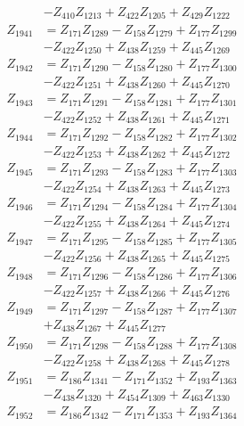\begin{multicols}{2}
\begin{align}
&- Z_{410}Z_{1213} + Z_{422}Z_{1205} + Z_{429}Z_{1222} \nonumber \\
Z_{1941} &= Z_{171}Z_{1289} - Z_{158}Z_{1279} + Z_{177}Z_{1299}  \nonumber \\
&- Z_{422}Z_{1250} + Z_{438}Z_{1259} + Z_{445}Z_{1269} \nonumber \\
Z_{1942} &= Z_{171}Z_{1290} - Z_{158}Z_{1280} + Z_{177}Z_{1300}  \nonumber \\
&- Z_{422}Z_{1251} + Z_{438}Z_{1260} + Z_{445}Z_{1270} \nonumber \\
Z_{1943} &= Z_{171}Z_{1291} - Z_{158}Z_{1281} + Z_{177}Z_{1301}  \nonumber \\
&- Z_{422}Z_{1252} + Z_{438}Z_{1261} + Z_{445}Z_{1271} \nonumber \\
Z_{1944} &= Z_{171}Z_{1292} - Z_{158}Z_{1282} + Z_{177}Z_{1302}  \nonumber \\
&- Z_{422}Z_{1253} + Z_{438}Z_{1262} + Z_{445}Z_{1272} \nonumber \\
Z_{1945} &= Z_{171}Z_{1293} - Z_{158}Z_{1283} + Z_{177}Z_{1303}  \nonumber \\
&- Z_{422}Z_{1254} + Z_{438}Z_{1263} + Z_{445}Z_{1273} \nonumber \\
Z_{1946} &= Z_{171}Z_{1294} - Z_{158}Z_{1284} + Z_{177}Z_{1304}  \nonumber \\
&- Z_{422}Z_{1255} + Z_{438}Z_{1264} + Z_{445}Z_{1274} \nonumber \\
Z_{1947} &= Z_{171}Z_{1295} - Z_{158}Z_{1285} + Z_{177}Z_{1305}  \nonumber \\
&- Z_{422}Z_{1256} + Z_{438}Z_{1265} + Z_{445}Z_{1275} \nonumber \\
Z_{1948} &= Z_{171}Z_{1296} - Z_{158}Z_{1286} + Z_{177}Z_{1306}  \nonumber \\
&- Z_{422}Z_{1257} + Z_{438}Z_{1266} + Z_{445}Z_{1276} \nonumber \\
Z_{1949} &= Z_{171}Z_{1297} - Z_{158}Z_{1287} + Z_{177}Z_{1307}  \nonumber \\
&+ Z_{438}Z_{1267} + Z_{445}Z_{1277} \nonumber \\
Z_{1950} &= Z_{171}Z_{1298} - Z_{158}Z_{1288} + Z_{177}Z_{1308}  \nonumber \\
&- Z_{422}Z_{1258} + Z_{438}Z_{1268} + Z_{445}Z_{1278} \nonumber \\
Z_{1951} &= Z_{186}Z_{1341} - Z_{171}Z_{1352} + Z_{193}Z_{1363}  \nonumber \\
&- Z_{438}Z_{1320} + Z_{454}Z_{1309} + Z_{463}Z_{1330} \nonumber \\
Z_{1952} &= Z_{186}Z_{1342} - Z_{171}Z_{1353} + Z_{193}Z_{1364}  \nonumber \\

\end{align}
\end{multicols}

